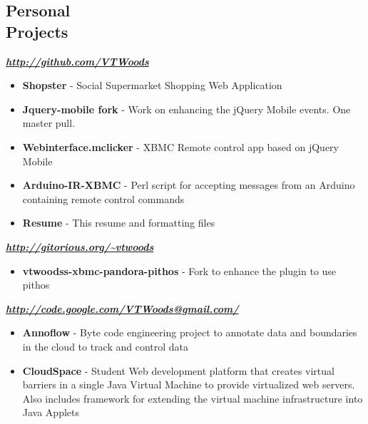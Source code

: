 \documentclass[line,margin]{res}
\begin{document}
\begin{resume}
\section{Personal \\ Projects}
\textbf{\emph{\url{http://github.com/VTWoods}}}
\begin{itemize} \itemsep -2pt %
\item \textbf{Shopster} - Social Supermarket Shopping Web Application
\item \textbf{Jquery-mobile fork} - Work on enhancing the jQuery Mobile events. One master pull.
\item \textbf{Webinterface.mclicker} - XBMC Remote control app based on jQuery Mobile 
\item \textbf{Arduino-IR-XBMC} - Perl script for accepting messages from an Arduino containing remote control commands
\item \textbf{Resume} - This resume and formatting files
\end{itemize}
\textbf{\emph{\url{http://gitorious.org/~vtwoods}}}
\begin{itemize} \itemsep -2pt %
\item \textbf{vtwoodss-xbmc-pandora-pithos} - Fork to enhance the plugin to use pithos
\end{itemize}
\textbf{\emph{\url{http://code.google.com/VTWoods@gmail.com/}}}
\begin{itemize} \itemsep -2pt %
\item \textbf{Annoflow} - Byte code engineering project to annotate data and boundaries in the cloud to track and control data
\item \textbf{CloudSpace} - Student Web development platform that creates virtual barriers in a single Java Virtual Machine to provide virtualized web servers.  Also includes framework for extending the virtual machine infrastructure into Java Applets
\end{itemize}


\end{resume}
\end{document}
